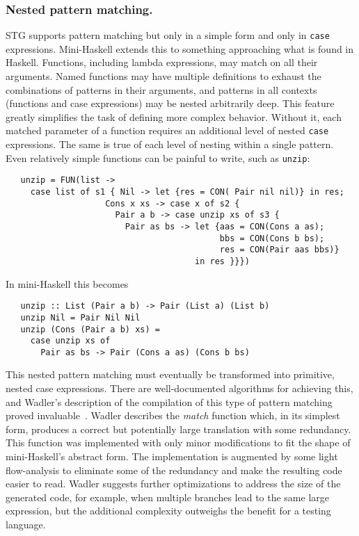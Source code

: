 \documentclass{llncs}
\begin{document}
\subsubsection{Nested pattern matching.}
STG supports pattern matching but only in a simple form and only in
\texttt{case} expressions.  Mini-Haskell extends this to something approaching
what is found in Haskell.  Functions, including lambda expressions, may match on
all their arguments. Named functions may have multiple definitions to exhaust
the combinations of patterns in their arguments, and patterns in all contexts
(functions and case expressions) may be nested arbitrarily deep.  This feature
greatly simplifies the task of defining more complex behavior.  Without it,
each matched parameter of a function requires an additional level of nested
\texttt{case} expressions. The same is true of each level of nesting within a
single pattern.
%
Even relatively simple functions can be painful to write, such as \texttt{unzip}:
{\footnotesize
\begin{verbatim}
   unzip = FUN(list -> 
     case list of s1 { Nil -> let {res = CON( Pair nil nil)} in res;
                    Cons x xs -> case x of s2 {
                      Pair a b -> case unzip xs of s3 {
                        Pair as bs -> let {aas = CON(Cons a as);
                                           bbs = CON(Cons b bs);
                                           res = CON(Pair aas bbs)}
                                      in res }}})
\end{verbatim}}
\noindent In mini-Haskell this becomes
{\footnotesize
\begin{verbatim}
   unzip :: List (Pair a b) -> Pair (List a) (List b)
   unzip Nil = Pair Nil Nil
   unzip (Cons (Pair a b) xs) =
     case unzip xs of
       Pair as bs -> Pair (Cons a as) (Cons b bs)

\end{verbatim}}
This nested pattern matching must eventually be transformed into
primitive, nested case expressions.  There are well-documented
algorithms for achieving this, and Wadler's description
of the compilation of this type of pattern matching proved
invaluable~\cite{Jones:1987}.
Wadler describes the \emph{match} function which, in its simplest form,
produces a correct but potentially large translation with some redundancy.
This function was implemented with only minor modifications to fit the shape
of mini-Haskell's abstract form.  The implementation is augmented by some
light flow-analysis to eliminate some of the redundancy and make the resulting
code easier to read.  Wadler suggests further optimizations to address the
size of the generated code, for example, when multiple branches lead to the
same large expression, but the additional complexity outweighs the benefit for
a testing language.
\end{document}
